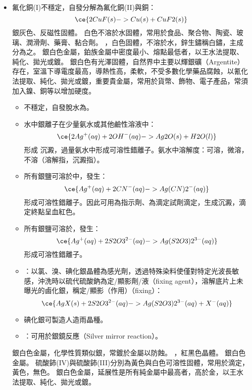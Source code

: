 \documentclass[a4paper,12pt]{report}
\begin{document}
\begin{itemize}
\begin{itemize}
\item 氟化銅(I)不穩定，自發分解為氟化銅(II)與銅：
\[\ce{2CuF(s) -> Cu(s) + CuF2(s)}\]
\eit
{}
銀灰色、反磁性固體。
白色不溶於水固體，常用於食品、聚合物、陶瓷、玻璃、潤滑劑、藥膏、黏合劑。
，白色固體，不溶於水，鋅生鏽稱白鏽，主成分為之。
銀白色金屬，鉑族金屬中密度最小、熔點最低者，以王水法提取、純化、拋光或鍍。
銀白色有光澤固體，自然界中主要以輝銀礦（Argentite）存在，室溫下導電度最高，導熱性高，柔軟，不受多數化學藥品腐蝕，以氰化法提取、純化、拋光或鍍，重要貴金屬，常用於貨幣、飾物、電子產品，常須加入鎳、銅等以增加硬度。
\begin{itemize}
\item {}不穩定，自發脫水為。
\item 水中銀離子在少量氨水或其他鹼性溶液中：
\[\ce{2Ag^+(aq) + 2OH^-(aq) -> Ag2O(s) + H2O(l)}\]
形成 沉澱，過量氨水中形成可溶性錯離子。氨水中溶解度：可溶，微溶，不溶（溶解指，沉澱指）。
\item 所有銀鹽可溶於中，發生：
\[\ce{Ag^+(aq) + 2CN^-(aq) -> Ag(CN)2^-(aq)}\]
形成可溶性錯離子。因此可用為指示劑、為滴定試劑滴定，生成沉澱，滴定終點呈血紅色。
\item 所有銀鹽可溶於，發生：
\[\ce{Ag^+(aq) + 2S2O3^{2-}(aq) -> Ag(S2O3)2^{3-}(aq)}\]
形成可溶性錯離子。
\item {}：以氯、溴、碘化銀晶體為感光劑，透過特殊染料使僅對特定光波長敏感，沖洗時以硫代硫酸鈉為定/顯影劑/液（fixing agent），溶解底片上未曝光的鹵化銀，稱定/顯影（作用）（fixing）：
\[\ce{AgX(s) + 2S2O3^{2-}(aq) -> Ag(S2O3)2^{3-}(aq) + X^-(aq)}\]
\item 碘化銀可製造人造雨晶種。
\item {}：可用於銀鏡反應（Silver mirror reaction）。
\end{itemize}
銀白色金屬，化學性質類似銀，常鍍於金屬以防蝕。
，紅黑色晶體。
銀白色金屬。
硫酸鈰(IV)與硫酸鈰(III)分別為黃色與白色可溶性固體，常用於滴定，黃色，無色。
銀白色金屬，延展性是所有純金屬中最高者，高於金，以王水法提取、純化、拋光或鍍。

\end{itemize}
\end{itemize}
\end{document}
